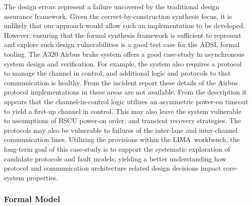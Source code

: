  The design errors represent a failure uncovered by the traditional design assurance
 framework.  Given the correct-by-construction synthesis focus, it is unlikely
 that our approach would allow such an implementation to be developed.  However,
 ensuring that the formal synthesis framework is sufficient to represent and
 explore such design vulnerabilities is a good test case for the ADSL formal
 tooling.  The A320 Airbus brake system offers a good case-study in asynchronous system design and verification. For example, the system also
 requires a protocol to manage the channel in control, and additional logic and
 protocols to that communication is healthy.  From the incident report these
 details of the Airbus protocol implementations in these areas are not
 available. From the description it appears that the channel-in-control logic
 utilizes an asymmetric power-on timeout to yield a first-up channel in
 control. This may also leave the system vulnerable to assumptions of BSCU
 power-on order, and transient recovery strategies.  The protocols may also be
 vulnerable to failures of the inter-lane and inter-channel communication lines.
  Utilizing the provisions within the LIMA\ workbench, the long-term goal
of this case-study is to support the systematic exploration of candidate
protocols and fault models; yielding a better understanding how protocol
and communication architecture related design decisions impact core-system
properties.
  \subsubsection{Formal Model}






